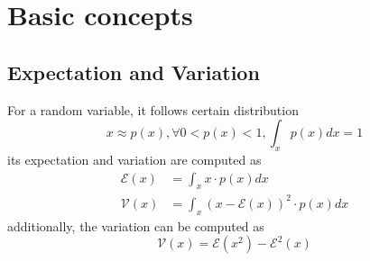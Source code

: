 \section{Basic concepts}
\subsection{Expectation and Variation}
For a random variable, it follows certain distribution
\begin{equation*}
    x \approx p(x), \forall 0 < p(x) < 1, \int_x p(x) dx = 1
\end{equation*}
its expectation and variation are computed as
\begin{align*}
    \mathcal{E} (x) & = \int_x x \cdot p(x) dx                      \\
    \mathcal{V} (x) & = \int_x (x-\mathcal{E}(x)) ^ 2 \cdot p(x) dx
\end{align*}
additionally, the variation can be computed as
\begin{equation*}
    \mathcal{V} (x) = \mathcal{E} (x^2) - \mathcal{E}^2 (x)
\end{equation*}


